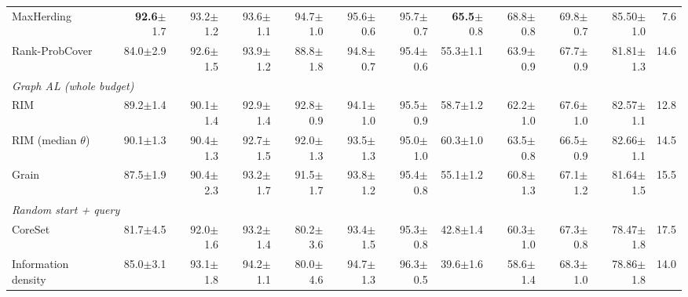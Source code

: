 \begin{table}[t]
\begin{adjustbox}{max width=\textwidth}
\begin{tabular}{lrrrrrrrrrrr}
\quad MaxHerding~\cite{bae2024generalized} & \textbf{92.6}{\scriptsize$\pm$1.7} & 93.2{\scriptsize$\pm$1.2} & 93.6{\scriptsize$\pm$1.1} & 94.7{\scriptsize$\pm$1.0} & 95.6{\scriptsize$\pm$0.6} & 95.7{\scriptsize$\pm$0.7} & \textbf{65.5}{\scriptsize$\pm$0.8} & 68.8{\scriptsize$\pm$0.8} & 69.8{\scriptsize$\pm$0.7} & 85.50{\scriptsize$\pm$1.0} & 7.6 \\
\quad Rank-ProbCover & 84.0{\scriptsize$\pm$2.9} & 92.6{\scriptsize$\pm$1.5} & 93.9{\scriptsize$\pm$1.2} & 88.8{\scriptsize$\pm$1.8} & 94.8{\scriptsize$\pm$0.7} & 95.4{\scriptsize$\pm$0.6} & 55.3{\scriptsize$\pm$1.1} & 63.9{\scriptsize$\pm$0.9} & 67.7{\scriptsize$\pm$0.9} & 81.81{\scriptsize$\pm$1.3} & 14.6 \\
\multicolumn{12}{l}{\textit{Graph AL (whole budget)}} \\
\quad RIM~\cite{zhang2021rim} & 89.2{\scriptsize$\pm$1.4} & 90.1{\scriptsize$\pm$1.4} & 92.9{\scriptsize$\pm$1.4} & 92.8{\scriptsize$\pm$0.9} & 94.1{\scriptsize$\pm$1.0} & 95.5{\scriptsize$\pm$0.9} & 58.7{\scriptsize$\pm$1.2} & 62.2{\scriptsize$\pm$1.0} & 67.6{\scriptsize$\pm$1.0} & 82.57{\scriptsize$\pm$1.1} & 12.8 \\
\quad RIM (median $\theta$)~\cite{zhang2021rim} & 90.1{\scriptsize$\pm$1.3} & 90.4{\scriptsize$\pm$1.3} & 92.7{\scriptsize$\pm$1.5} & 92.0{\scriptsize$\pm$1.3} & 93.5{\scriptsize$\pm$1.3} & 95.0{\scriptsize$\pm$1.0} & 60.3{\scriptsize$\pm$1.0} & 63.5{\scriptsize$\pm$0.8} & 66.5{\scriptsize$\pm$0.9} & 82.66{\scriptsize$\pm$1.1} & 14.5 \\
\quad Grain~\cite{zhang2021grain} & 87.5{\scriptsize$\pm$1.9} & 90.4{\scriptsize$\pm$2.3} & 93.2{\scriptsize$\pm$1.7} & 91.5{\scriptsize$\pm$1.7} & 93.8{\scriptsize$\pm$1.2} & 95.4{\scriptsize$\pm$0.8} & 55.1{\scriptsize$\pm$1.2} & 60.8{\scriptsize$\pm$1.3} & 67.1{\scriptsize$\pm$1.2} & 81.64{\scriptsize$\pm$1.5} & 15.5 \\
\multicolumn{12}{l}{\textit{Random start + query}} \\
\quad CoreSet~\cite{sener2017active} & 81.7{\scriptsize$\pm$4.5} & 92.0{\scriptsize$\pm$1.6} & 93.2{\scriptsize$\pm$1.4} & 80.2{\scriptsize$\pm$3.6} & 93.4{\scriptsize$\pm$1.5} & 95.3{\scriptsize$\pm$0.8} & 42.8{\scriptsize$\pm$1.4} & 60.3{\scriptsize$\pm$1.0} & 67.3{\scriptsize$\pm$0.8} & 78.47{\scriptsize$\pm$1.8} & 17.5 \\
\quad Information density~\cite{settles2008analysis} & 85.0{\scriptsize$\pm$3.1} & 93.1{\scriptsize$\pm$1.8} & 94.2{\scriptsize$\pm$1.1} & 80.0{\scriptsize$\pm$4.6} & 94.7{\scriptsize$\pm$1.3} & 96.3{\scriptsize$\pm$0.5} & 39.6{\scriptsize$\pm$1.6} & 58.6{\scriptsize$\pm$1.4} & 68.3{\scriptsize$\pm$1.0} & 78.86{\scriptsize$\pm$1.8} & 14.0 \\

\end{tabular}
\end{adjustbox}
\end{table}
